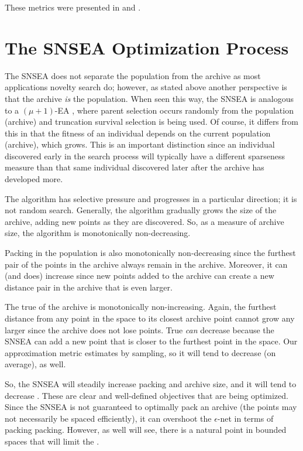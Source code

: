 \documentclass[twoside]{article}
\begin{document}
These metrics were presented in \citet{Wiegand2020flairs} and \citet{Wiegand2021flairs}.



\section{The SNSEA Optimization Process}
\label{sec:resultssnsea}

The SNSEA does not separate the population from the archive as most applications novelty search do; however, as stated above another perspective is that the archive \emph{is} the population.  When seen this way, the SNSEA is analogous to a $(\mu+1)$-EA \citep{ec:DeJong2006}, where parent selection occurs randomly from the population (archive) and truncation survival selection is being used.  Of course, it differs from this in that the fitness of an individual depends on the current population (archive), which grows.  This is an important distinction since an individual discovered early in the search process will typically have a different sparseness measure than that same individual discovered later after the archive has developed more.

The algorithm has selective pressure and progresses in a particular direction; it is not random search.  Generally, the algorithm gradually grows the size of the archive, adding new points as they are discovered.  So, as a measure of archive size, the algorithm is monotonically non-decreasing.

Packing in the population is also monotonically non-decreasing since the furthest pair of the points in the archive always remain in the archive.  Moreover, it can (and does) increase since new points added to the archive can create a new distance pair in the archive that is even larger.

The true  of the archive is monotonically non-increasing.  Again, the furthest distance from any point in the space to its closest archive point cannot grow any larger since the archive does not lose points.  True  \emph{can} decrease because the SNSEA can add a new point that is closer to the furthest point in the space.  Our approximation metric estimates  by sampling, so it will tend to decrease (on average), as well.  

So, the SNSEA will steadily increase packing and archive size, and it will tend to decrease .  These are clear and well-defined objectives that are being optimized.  Since the SNSEA is not guaranteed to optimally pack an archive (the points may not necessarily be spaced efficiently), it can overshoot the $\epsilon$-net in terms of packing packing.  However, as well will see, there is a natural point in bounded spaces that will limit the .
\end{document}
